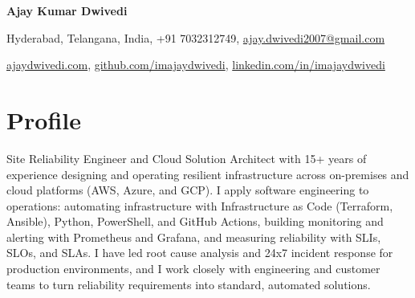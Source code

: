 \documentclass[10pt,a4paper]{article}
\begin{document}
\begin{center}
{\Huge\bfseries Ajay Kumar Dwivedi}

\vspace{6pt}
Hyderabad, Telangana, India, +91 7032312749, \href{mailto:ajay.dwivedi2007@gmail.com}{ajay.dwivedi2007@gmail.com}

\vspace{2pt}
\href{https://ajaydwivedi.com/}{ajaydwivedi.com}, \href{https://github.com/imajaydwivedi}{github.com/imajaydwivedi}, \href{https://linkedin.com/in/imajaydwivedi/}{linkedin.com/in/imajaydwivedi}
\end{center}

\section{Profile}
Site Reliability Engineer and Cloud Solution Architect with 15+ years of experience designing and operating resilient infrastructure across on-premises and cloud platforms (AWS, Azure, and GCP). I apply software engineering to operations: automating infrastructure with Infrastructure as Code (Terraform, Ansible), Python, PowerShell, and GitHub Actions, building monitoring and alerting with Prometheus and Grafana, and measuring reliability with SLIs, SLOs, and SLAs. I have led root cause analysis and 24x7 incident response for production environments, and I work closely with engineering and customer teams to turn reliability requirements into standard, automated solutions.
\end{document}
